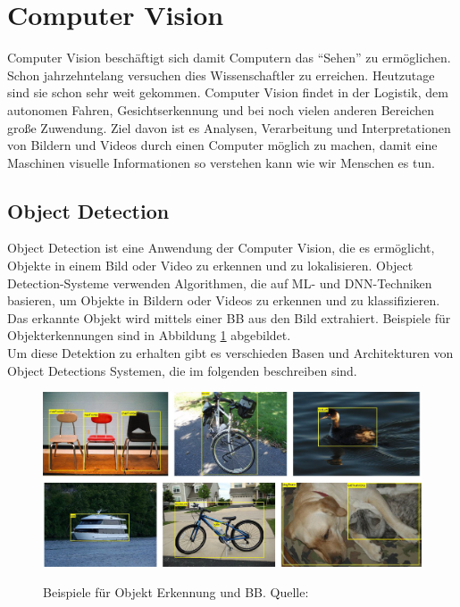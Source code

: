 \section{Computer Vision}

Computer Vision beschäftigt sich damit Computern das \enquote{Sehen} zu ermöglichen. Schon jahrzehntelang versuchen dies Wissenschaftler zu erreichen. Heutzutage sind sie schon sehr weit gekommen. Computer Vision findet in der Logistik, dem autonomen Fahren, Gesichtserkennung und bei noch vielen anderen Bereichen große Zuwendung. Ziel davon ist es Analysen, Verarbeitung und Interpretationen von Bildern und Videos durch einen Computer möglich zu machen, damit eine Maschinen visuelle Informationen so verstehen kann wie wir Menschen es tun. \cite{cv_Szeliski}

\subsection{Object Detection}

Object Detection ist eine Anwendung der Computer Vision, die es ermöglicht, Objekte in einem Bild oder Video zu erkennen und zu lokalisieren. Object Detection-Systeme verwenden Algorithmen, die auf \ac{ML}- und \ac{DNN}-Techniken basieren, um Objekte in Bildern oder Videos zu erkennen und zu klassifizieren. Das erkannte Objekt wird mittels einer \ac{BB} aus den Bild extrahiert. Beispiele für Objekterkennungen sind in Abbildung \ref{fif:ob_sample} abgebildet.
\\
Um diese Detektion zu erhalten gibt es verschieden Basen und Architekturen von Object Detections Systemen, die im folgenden beschreiben sind. \cite{cv_Szeliski}


\begin{figure}[h]
    \centering
    \includegraphics[width=\textwidth]{images/object_detection_sample.png}
    \label{fif:ob_sample}
    \caption{Beispiele für Objekt Erkennung und \acl{BB}. Quelle: \cite{cv_Szeliski}}
\end{figure}

